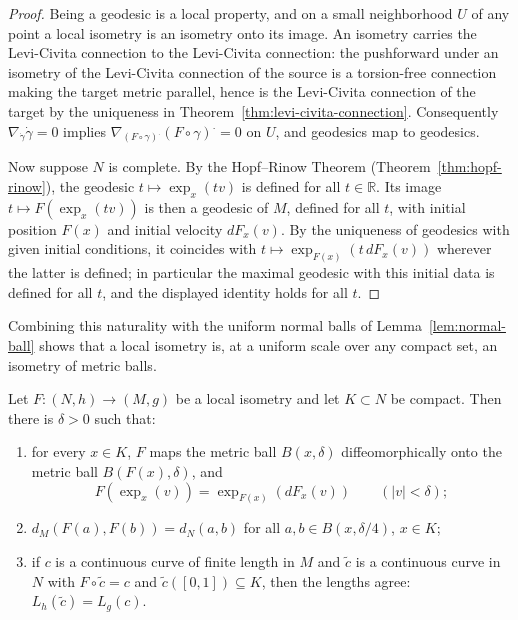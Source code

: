 \begin{proof}
\sketch
{}
Being a geodesic is a local property, and on a small neighborhood
$U$ of any point a local isometry is an isometry onto its image. An
isometry carries the Levi-Civita connection to the Levi-Civita
connection: the pushforward under an isometry of the Levi-Civita
connection of the source is a torsion-free connection making the
target metric parallel, hence is the Levi-Civita connection of the
target by the uniqueness in
Theorem~\ref{thm:levi-civita-connection}. Consequently
$\nabla_{\dot\gamma}\dot\gamma=0$ implies $\nabla_{(F\circ
\gamma)^{\textstyle .}}(F\circ\gamma)^{\textstyle .}=0$ on $U$, and
geodesics map to geodesics.

Now suppose $N$ is complete. By the Hopf--Rinow Theorem
(Theorem~\ref{thm:hopf-rinow}), the geodesic
$t\mapsto\exp_x(tv)$ is defined for all $t\in\mathbb{R}$. Its image
$t\mapsto F(\exp_x(tv))$ is then a geodesic of $M$, defined for all
$t$, with initial position $F(x)$ and initial velocity $dF_x(v)$. By
the uniqueness of geodesics with given initial conditions, it
coincides with $t\mapsto \exp_{F(x)}(t\,dF_x(v))$ wherever the
latter is defined; in particular the maximal geodesic with this
initial data is defined for all $t$, and the displayed identity
holds for all $t$.
\end{proof}

Combining this naturality with the uniform normal balls of
Lemma~\ref{lem:normal-ball} shows that a local isometry is, at a
uniform scale over any compact set, an isometry of metric balls.

\begin{lemma}
\label{lem:local-isometry-normal-balls}

Let $F\colon(N,h)\to(M,g)$ be a local isometry and let $K\subset
N$ be compact. Then there is $\delta>0$ such that:
\begin{enumerate}
\item for every $x\in K$, $F$ maps the metric ball $B(x,\delta)$
diffeomorphically onto the metric ball $B(F(x),\delta)$, and
$$F\left(\exp_x(v)\right)=\exp_{F(x)}\left(dF_x(v)\right)
\qquad(|v|<\delta);$$
\item $d_M\left(F(a),F(b)\right)=d_N(a,b)$ for all $a,b\in
B(x,\delta/4)$, $x\in K$;
\item if $c$ is a continuous curve of finite length in $M$ and
$\tilde c$ is a continuous curve in $N$ with $F\circ\tilde c=c$
and $\tilde c([0,1])\subseteq K$, then the lengths agree:
$L_h(\tilde c)=L_g(c)$.
\end{enumerate}
\end{lemma}

